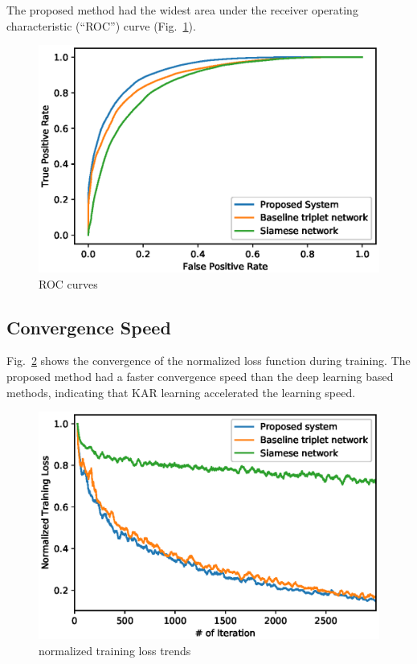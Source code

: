 The proposed method had the widest area under the receiver operating characteristic (``ROC'') curve (Fig.~\ref{fig_roc}).
\begin{figure}[!ht]
    \includegraphics[width=\textwidth]{fig_roc_v17.eps}
    \caption{ROC curves} \label{fig_roc}
\end{figure}
\subsection{Convergence Speed}
Fig.~\ref{fig_loss} shows the convergence of the normalized loss function during training. The proposed method had a faster convergence speed than the deep learning based methods, indicating that KAR learning accelerated the learning speed.
 \begin{figure}[!ht]
    \includegraphics[width=\textwidth]{normalized_loss_curve_ma30_v3.eps}
    \caption{normalized training loss trends} \label{fig_loss}
\end{figure}
